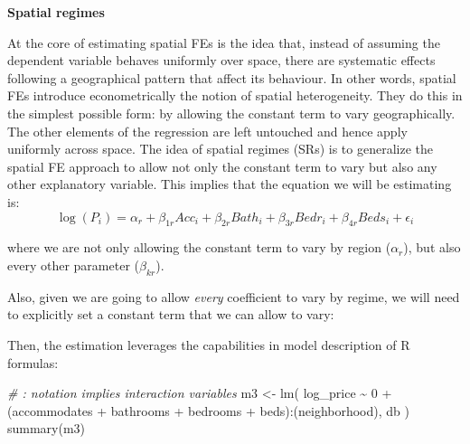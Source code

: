 \documentclass[
]{book}
\newenvironment{Shaded}{\begin{snugshade}}{\end{snugshade}}
\newcommand{\CommentTok}[1]{\textcolor[rgb]{0.56,0.35,0.01}{\textit{#1}}}
\newcommand{\DecValTok}[1]{\textcolor[rgb]{0.00,0.00,0.81}{#1}}
\newcommand{\FunctionTok}[1]{\textcolor[rgb]{0.00,0.00,0.00}{#1}}
\newcommand{\NormalTok}[1]{#1}
\newcommand{\OtherTok}[1]{\textcolor[rgb]{0.56,0.35,0.01}{#1}}
\newcommand{\SpecialCharTok}[1]{\textcolor[rgb]{0.00,0.00,0.00}{#1}}
\newcommand{\StringTok}[1]{\textcolor[rgb]{0.31,0.60,0.02}{#1}}
\begin{document}
\textbf{Spatial regimes}

At the core of estimating spatial FEs is the idea that, instead of assuming the dependent variable behaves uniformly over space, there are systematic effects following a geographical pattern that affect its behaviour. In other words, spatial FEs introduce econometrically the notion of spatial heterogeneity. They do this in the simplest possible form: by allowing the constant term to vary geographically. The other elements of the regression are left untouched and hence apply uniformly across space. The idea of spatial regimes (SRs) is to generalize the spatial FE approach to allow not only the constant term to vary but also any other explanatory variable. This implies that the equation we will be estimating is:
\[
\log(P_i) = \alpha_r + \beta_{1r} Acc_i + \beta_{2r} Bath_i + \beta_{3r} Bedr_i + \beta_{4r} Beds_i + \epsilon_i
\]

where we are not only allowing the constant term to vary by region (\(\alpha_r\)), but also every other parameter (\(\beta_{kr}\)).

Also, given we are going to allow \emph{every} coefficient to vary by regime, we will need to explicitly set a constant term that we can allow to vary:

\begin{Shaded}
\end{Shaded}

Then, the estimation leverages the capabilities in model description of R formulas:

\begin{Shaded}
\begin{Highlighting}[]
\CommentTok{\# \textasciigrave{}:\textasciigrave{} notation implies interaction variables}
\NormalTok{m3 }\OtherTok{\textless{}{-}} \FunctionTok{lm}\NormalTok{(}
  \StringTok{\textquotesingle{}log\_price \textasciitilde{} 0 + (accommodates + bathrooms + bedrooms + beds):(neighborhood)\textquotesingle{}}\NormalTok{, }
\NormalTok{  db}
\NormalTok{)}
\FunctionTok{summary}\NormalTok{(m3)}
\end{Highlighting}
\end{Shaded}
\end{document}
